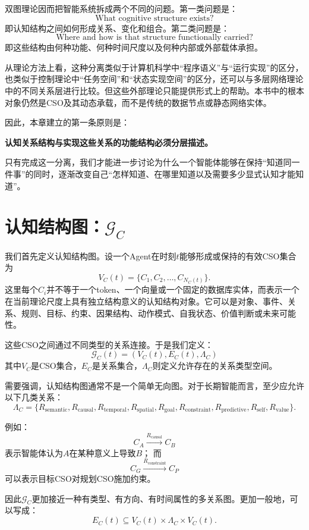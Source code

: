 双图理论因而把智能系统拆成两个不同的问题。第一类问题是：
\[
\text{What cognitive structure exists?}
\]
即认知结构之间如何形成关系、变化和组合。第二类问题是：
\[
\text{Where and how is that structure functionally carried?}
\]
即这些结构由何种功能、何种时间尺度以及何种内部或外部载体承担。

从理论方法上看，这种分离类似于计算机科学中“程序语义”与“运行实现”的区分，也类似于控制理论中“任务空间”和“状态实现空间”的区分，还可以与多层网络理论中的不同关系层进行比较。但这些外部理论只能提供形式上的帮助。本书中的根本对象仍然是CSO及其动态承载，而不是传统的数据节点或静态网络实体。

因此，本章建立的第一条原则是：
\begin{proposition*}
\bfseries 认知关系结构与实现这些关系的功能结构必须分层描述。
\end{proposition*}

只有完成这一分离，我们才能进一步讨论为什么一个智能体能够在保持“知道同一件事”的同时，逐渐改变自己“怎样知道、在哪里知道以及需要多少显式认知才能知道”。

\section{认知结构图：$\mathcal G_C$}

我们首先定义认知结构图。设一个Agent在时刻$t$能够形成或保持的有效CSO集合为
\[
V_C(t)=\{C_1,C_2,\ldots,C_{N_C(t)}\}.
\]
这里每个$C_i$并不等于一个token、一个向量或一个固定的数据库实体，而表示一个在当前理论尺度上具有独立结构意义的认知结构对象。它可以是对象、事件、关系、规则、目标、约束、因果结构、动作模式、自我状态、价值判断或未来可能性。

这些CSO之间通过不同类型的关系连接。于是我们定义：
\[
\boxed{
\mathcal G_C(t)
=
\left(
V_C(t),
E_C(t),
\Lambda_C
\right)
}
\]
其中$V_C$是CSO集合，$E_C$是关系集合，$\Lambda_C$则定义允许存在的关系类型空间。

需要强调，认知结构图通常不是一个简单无向图。对于长期智能而言，至少应允许以下几类关系：
\[
\Lambda_C
=
\{
R_{\text{semantic}},
R_{\text{causal}},
R_{\text{temporal}},
R_{\text{spatial}},
R_{\text{goal}},
R_{\text{constraint}},
R_{\text{predictive}},
R_{\text{self}},
R_{\text{value}}
\}.
\]

例如：
\[
C_A
\xrightarrow{R_{\text{causal}}}
C_B
\]
表示智能体认为$A$在某种意义上导致$B$；
而
\[
C_G
\xrightarrow{R_{\text{constraint}}}
C_P
\]
可以表示目标CSO对规划CSO施加约束。

因此$\mathcal G_C$更加接近一种有类型、有方向、有时间属性的多关系图。更加一般地，可以写成：
\[
E_C(t)
\subseteq
V_C(t)
\times
\Lambda_C
\times
V_C(t).
\]

